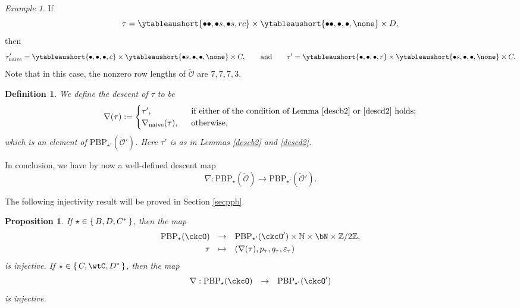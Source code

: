 \documentclass[12pt,a4paper]{amsart}
\newcommand{\BN}{{\mathbb {N}}}
\newcommand{\CO}{{\mathcal {O}}}
\newcommand{\Z}{\mathbb{Z}}
\def\DD{\nabla}
\numberwithin{equation}{section}
\newtheorem{prop}[thm]{Proposition}
\newtheorem{defn}[thm]{Definition}
\theoremstyle{remark}
\newtheorem*{Example}{Example}
\let\ytb=\ytableaushort
\def\ckcOp{\ckcO^{\prime}}
\def\PBP{\mathrm{PBP}}
\begin{document}
\begin{Example}
 If
 \[
 \tau= \ytb{\bullet\bullet, \bullet s, \bullet s, r c} \times \ytb{\bullet\bullet,\bullet,\bullet, \none }\times
  D,
 \]
 then
\[
 \tau'_{\mathrm{naive}}=\ytb{\bullet, \bullet , \bullet ,  c} \times \ytb{\bullet s,\bullet,\bullet, \none } \times
  C,\qquad\textrm{and}\qquad \tau'=\ytb{\bullet, \bullet , \bullet ,  r} \times \ytb{\bullet s,\bullet,\bullet, \none } \times
  C.
 \]
 Note that in this case, the nonzero row lengths of $\check \CO$ are $7,7,7,3$.
\end{Example}

\begin{defn}
We define the descent of $\tau$ to be
\[
  \nabla(\tau):= \begin{cases}
  \tau', & \ \text{ if either of the condition of Lemma \ref{descb2}  or \ref{descd2} holds}; \\
  \nabla_{\mathrm{naive}}( \tau), & \ \text{ otherwise},
\end{cases}
\]
which is an element of $  \mathrm{PBP}_{\star'}(\check \CO')$.
Here $\tau'$ is as in Lemmas  \ref{descb2} and \ref{descd2}.
\end{defn}
In conclusion, we have by now a well-defined descent map
\[
\nabla: \mathrm{PBP}_{\star}(\check \CO)\rightarrow \mathrm{PBP}_{\star'}(\check \CO').
\]


The following injectivity result will be  proved in Section \ref{secppb}. %

\begin{prop}\label{prop:DD.BDinj}
If $\star \in \set{B, D,C^*}$, then the map
\begin{equation}
  \begin{array}{rcl}
   \PBP_\star(\ckcO)&\rightarrow&
   \PBP_{\star'}(\ckcOp)\times \BN\times \bN\times \Z/2\Z, \smallskip\\
   \tau& \mapsto & (\DD(\tau), p_\tau, q_\tau, \varepsilon_\tau)
   \end{array}
\end{equation}
is injective. If $\star \in  \set{C,\wtC,D^*}$, then the map
\begin{equation}
  \begin{array}{rcl}
  \DD:  \PBP_\star(\ckcO)&\rightarrow&
   \PBP_{\star'}(\ckcOp)
   \end{array}
\end{equation}
is injective.

\end{prop}
\end{document}
